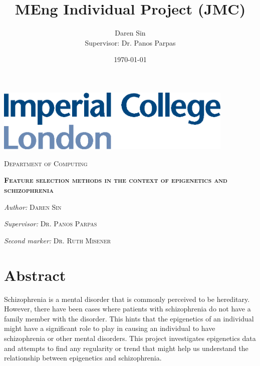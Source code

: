 \documentclass[12pt, twoside, a4paper]{report}
\title{MEng Individual Project (JMC)}
\author{Daren Sin \\  Supervisor: Dr. Panos Parpas}
\date{\today}
\newcommand\blankpage{%
    \null
    \thispagestyle{empty}%
    \addtocounter{page}{-1}%
    \newpage}
\begin{document}
\begin{titlingpage}

\vspace*{1.5cm}

\begin{center}
\includegraphics[height=3cm]{images/imperial}
\end{center}

\vspace{1.5cm}
\begin{center}
\Large

\textsc{Department of Computing}
\end{center}

\vspace{2cm}

\begin{center}
\Large \textsc{\thetitle}

\vspace{2cm}

\textsc{\textbf{Feature selection methods in the context of epigenetics and schizophrenia}}

\end{center}

\vspace{2cm}

\begin{center}
\large \textit{Author:} \textsc{Daren Sin}

\textit{Supervisor:} \textsc{Dr. Panos Parpas}

\textit{Second marker:} \textsc{Dr. Ruth Misener}
\end{center}

\vspace{2cm}

\begin{center}
\normalsize \textsc{\thedate}
\end{center}

\end{titlingpage}


\afterpage{\blankpage}

\singlespacing
\chapter*{Abstract}
Schizophrenia is a mental disorder that is commonly perceived to be hereditary. However, there have been cases where patients with schizophrenia do not have a family member with the disorder. This hints that the epigenetics of an individual might have a significant role to play in causing an individual to have schizophrenia or other mental disorders. This project investigates epigenetics data and attempts to find any regularity or trend that might help us understand the relationship between epigenetics and schizophrenia.
\end{document}
